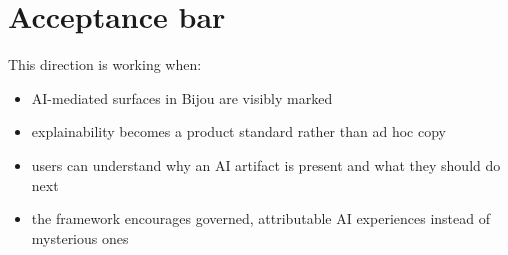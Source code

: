 \section{Acceptance bar}\label{record-033-acceptance-bar}

This direction is working when:

\begin{itemize}
\tightlist
\item
  AI-mediated surfaces in Bijou are visibly marked
\item
  explainability becomes a product standard rather than ad hoc copy
\item
  users can understand why an AI artifact is present and what they should do next
\item
  the framework encourages governed, attributable AI experiences instead of mysterious ones
\end{itemize}

